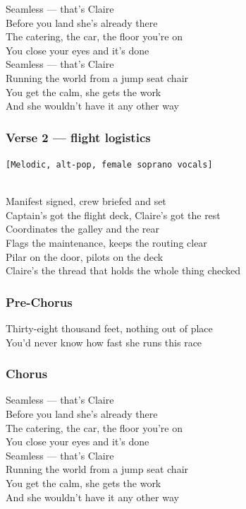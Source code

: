 Seamless --- that's Claire\\
Before you land she's already there\\
The catering, the car, the floor you're on\\
You close your eyes and it's done\\
Seamless --- that's Claire\\
Running the world from a jump seat chair\\
You get the calm, she gets the work\\
And she wouldn't have it any other way

\subsubsection{Verse 2 --- flight
logistics}\label{verse-2-flight-logistics}

\texttt{{[}Melodic,\ alt-pop,\ female\ soprano\ vocals{]}}\strut \\
Manifest signed, crew briefed and set\\
Captain's got the flight deck, Claire's got the rest\\
Coordinates the galley and the rear\\
Flags the maintenance, keeps the routing clear\\
Pilar on the door, pilots on the deck\\
Claire's the thread that holds the whole thing checked

\subsubsection{Pre-Chorus}\label{pre-chorus-47}

Thirty-eight thousand feet, nothing out of place\\
You'd never know how fast she runs this race

\subsubsection{Chorus}\label{chorus-68}

Seamless --- that's Claire\\
Before you land she's already there\\
The catering, the car, the floor you're on\\
You close your eyes and it's done\\
Seamless --- that's Claire\\
Running the world from a jump seat chair\\
You get the calm, she gets the work\\
And she wouldn't have it any other way

